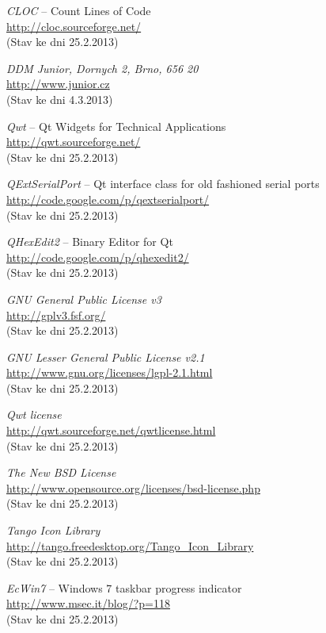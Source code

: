 \documentclass[12pt, a4paper, oneside]{article}
\newcommand{\It}{\textit}  %
\begin{document}
\begin{thebibliography}{99}
     \It{CLOC} -- Count Lines of Code \\
    \url{http://cloc.sourceforge.net/}\\
    (Stav ke dni 25.2.2013)

     \It{DDM Junior, Dornych 2, Brno, 656 20}\\
    \url{http://www.junior.cz}\\
    (Stav ke dni 4.3.2013)

     \It{Qwt} -- Qt Widgets for Technical Applications \\
    \url{http://qwt.sourceforge.net/}\\
    (Stav ke dni 25.2.2013)

     \It{QExtSerialPort} -- Qt interface class for old fashioned serial ports \\
    \url{http://code.google.com/p/qextserialport/}\\
    (Stav ke dni 25.2.2013)

     \It{QHexEdit2} -- Binary Editor for Qt \\
    \url{http://code.google.com/p/qhexedit2/}\\
    (Stav ke dni 25.2.2013)

     \It{GNU General Public License v3} \\
    \url{http://gplv3.fsf.org/}\\
    (Stav ke dni 25.2.2013)

     \It{GNU Lesser General Public License v2.1} \\
    \url{http://www.gnu.org/licenses/lgpl-2.1.html}\\
    (Stav ke dni 25.2.2013)

     \It{Qwt license} \\
    \url{http://qwt.sourceforge.net/qwtlicense.html}\\
    (Stav ke dni 25.2.2013)

     \It{The New BSD License} \\
    \url{http://www.opensource.org/licenses/bsd-license.php}\\
    (Stav ke dni 25.2.2013)

     \It{Tango Icon Library} \\
    \url{http://tango.freedesktop.org/Tango_Icon_Library}\\
    (Stav ke dni 25.2.2013)

     \It{EcWin7} -- Windows 7 taskbar progress indicator \\
    \url{http://www.msec.it/blog/?p=118}\\
    (Stav ke dni 25.2.2013)


\end{thebibliography}
\end{document}
